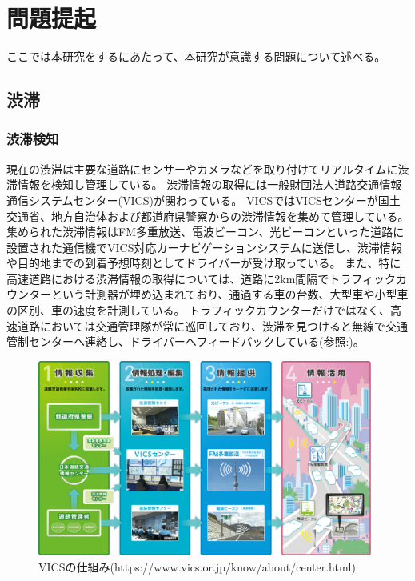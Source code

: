 \chapter{問題提起}
ここでは本研究をするにあたって、本研究が意識する問題について述べる。

\section{渋滞}
\subsection{渋滞検知}
現在の渋滞は主要な道路にセンサーやカメラなどを取り付けてリアルタイムに渋滞情報を検知し管理している。
渋滞情報の取得には一般財団法人道路交通情報通信システムセンター(VICS)が関わっている。
VICSではVICSセンターが国土交通省、地方自治体および都道府県警察からの渋滞情報を集めて管理している。
集められた渋滞情報はFM多重放送、電波ビーコン、光ビーコンといった道路に設置された通信機でVICS対応カーナビゲーションシステムに送信し、渋滞情報や目的地までの到着予想時刻としてドライバーが受け取っている。
また、特に高速道路における渋滞情報の取得については、道路に2km間隔でトラフィックカウンターという計測器が埋め込まれており、通過する車の台数、大型車や小型車の区別、車の速度を計測している。
トラフィックカウンターだけではなく、高速道路においては交通管理隊が常に巡回しており、渋滞を見つけると無線で交通管制センターへ連絡し、ドライバーへフィードバックしている(参照:)。

\begin{figure}[htbp]
  \begin{center}
   \includegraphics[width=11cm]{figs/vics.png}
  \end{center}
  \caption{VICSの仕組み(https://www.vics.or.jp/know/about/center.html)}
  \label{fig:vics_system}
\end{figure}

